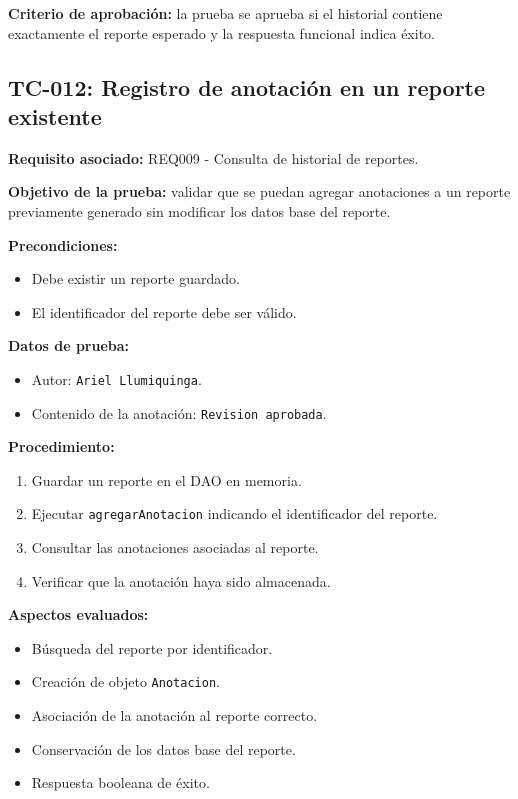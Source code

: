 \documentclass[12pt,a4paper]{article}
\begin{document}
\textbf{Criterio de aprobación:} la prueba se aprueba si el historial contiene exactamente el reporte esperado y la respuesta funcional indica éxito.

\subsection{TC-012: Registro de anotación en un reporte existente}

\textbf{Requisito asociado:} REQ009 - Consulta de historial de reportes.

\textbf{Objetivo de la prueba:} validar que se puedan agregar anotaciones a un reporte previamente generado sin modificar los datos base del reporte.

\textbf{Precondiciones:}
\begin{itemize}[leftmargin=*]
    \item Debe existir un reporte guardado.
    \item El identificador del reporte debe ser válido.
\end{itemize}

\textbf{Datos de prueba:}
\begin{itemize}[leftmargin=*]
    \item Autor: \texttt{Ariel Llumiquinga}.
    \item Contenido de la anotación: \texttt{Revision aprobada}.
\end{itemize}

\textbf{Procedimiento:}
\begin{enumerate}[leftmargin=*]
    \item Guardar un reporte en el DAO en memoria.
    \item Ejecutar \texttt{agregarAnotacion} indicando el identificador del reporte.
    \item Consultar las anotaciones asociadas al reporte.
    \item Verificar que la anotación haya sido almacenada.
\end{enumerate}

\textbf{Aspectos evaluados:}
\begin{itemize}[leftmargin=*]
    \item Búsqueda del reporte por identificador.
    \item Creación de objeto \texttt{Anotacion}.
    \item Asociación de la anotación al reporte correcto.
    \item Conservación de los datos base del reporte.
    \item Respuesta booleana de éxito.
\end{itemize}
\end{document}
